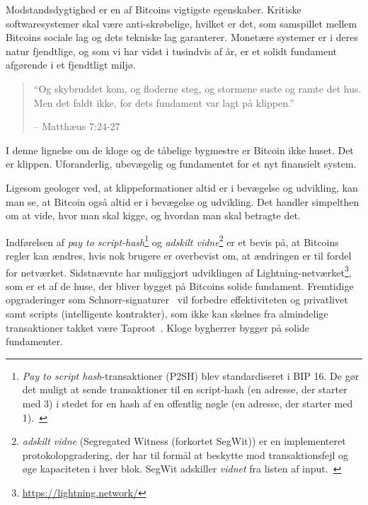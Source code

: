 \documentclass[paper=6in:9in,pagesize=pdftex,headinclude=on,footinclude=on,12pt]{scrbook}
\begin{document}
Modstandsdygtighed er en af Bitcoins vigtigste egenskaber. Kritiske softwaresystemer skal være anti-skrøbelige, hvilket er det, som samspillet mellem Bitcoins sociale lag og dets tekniske lag garanterer. Monetære systemer er i deres natur fjendtlige, og som vi har vidst i tusindvis af år, er et solidt fundament afgørende i et fjendtligt miljø.\begin{quotation}\begin{samepage} \enquote{Og skybruddet kom, og floderne steg, og stormene suste og ramte det hus. Men det faldt ikke, for dets fundament var lagt på klippen.} \begin{flushright} -- Matthæus 7:24-27 \end{flushright}\end{samepage}\end{quotation}

I denne lignelse om de kloge og de tåbelige bygmestre er Bitcoin ikke huset. Det er klippen. Uforanderlig, ubevægelig og fundamentet for et nyt finansielt system.

Ligesom geologer ved, at klippeformationer altid er i bevægelse og udvikling, kan man se, at Bitcoin også altid er i bevægelse og udvikling. Det handler simpelthen om at vide, hvor man skal kigge, og hvordan man skal betragte det.

Indførelsen af \textit{pay to script-hash}\footnote{ \textit{Pay to script hash}-transaktioner (P2SH) blev standardiseret i BIP 16. De gør det muligt at sende transaktioner til en script-hash (en adresse, der starter med 3) i stedet for en hash af en offentlig nøgle (en adresse, der starter med 1).~\cite{btcwiki:p2sh}} og \textit{adskilt vidne}\footnote{\textit{adskilt vidne} (Segregated Witness (forkortet SegWit)) er en implementeret protokolopgradering, der har til formål at beskytte mod transaktionsfejl og øge kapaciteten i hver blok. SegWit adskiller \textit{vidnet} fra listen af input.~\cite{btcwiki:segwit}} er et bevis på, at Bitcoins regler kan ændres, hvis nok brugere er overbevist om, at ændringen er til fordel for netværket. Sidstnævnte har muliggjort udviklingen af Lightning-netværket\footnote{\url{https://lightning.network/}}, som er et af de huse, der bliver bygget på Bitcoins solide fundament. Fremtidige opgraderinger som Schnorr-signaturer~\cite{bip:schnorr} vil forbedre effektiviteten og privatlivet samt scripts (intelligente kontrakter), som ikke kan skelnes fra almindelige transaktioner takket være Taproot~\cite{taproot}. Kloge bygherrer bygger på solide fundamenter.
\end{document}
